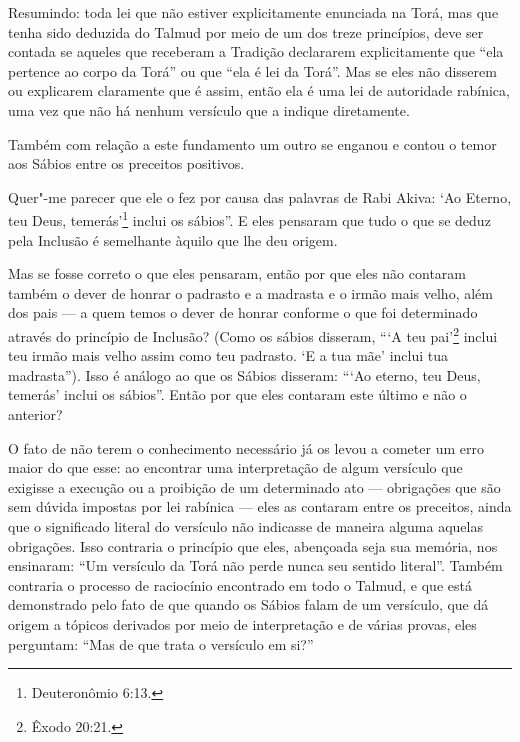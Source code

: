 Resumindo: toda lei que não estiver explicitamente enunciada na Torá\starr,
mas que tenha sido deduzida do Talmud\starr{} por meio de um dos treze
princípios, deve ser contada se aqueles que receberam a Tradição
declararem explicitamente que ``ela pertence ao corpo da Torá\starr'' ou que
``ela é lei da Torá\starr''. Mas se eles não disserem ou explicarem
claramente que é assim, então ela é uma lei de autoridade rabínica, uma
vez que não há nenhum versículo que a indique diretamente.

Também com relação a este fundamento um outro se enganou e contou o
temor aos Sábios entre os preceitos positivos.

Quer"-me parecer que ele o fez por causa das palavras de Rabi Akiva\starr: `Ao
Eterno, teu Deus, temerás'\footnote{Deuteronômio 6:13.} inclui os sábios''. E
eles pensaram que tudo o que se deduz pela Inclusão é semelhante àquilo
que lhe deu origem.

Mas se fosse correto o que eles pensaram, então por que eles não
contaram também o dever de honrar o padrasto e a madrasta e o irmão mais
velho, além dos pais --- a quem temos o dever de honrar conforme o que
foi determinado através do princípio de Inclusão? (Como os sábios
disseram, ```A teu pai'\footnote{Êxodo 20:21.} inclui teu irmão mais velho assim
como teu padrasto. `E a tua mãe' inclui tua madrasta''). Isso é análogo
ao que os Sábios disseram: ```Ao eterno, teu Deus, temerás' inclui os
sábios''. Então por que eles contaram este último e não o anterior?

O fato de não terem o conhecimento necessário já os levou a cometer um
erro maior do que esse: ao encontrar uma interpretação de algum
versículo que exigisse a execução ou a proibição de um determinado ato
--- obrigações que são sem dúvida impostas por lei rabínica --- eles as
contaram entre os preceitos, ainda que o significado literal do
versículo não indicasse de maneira alguma aquelas obrigações. Isso
contraria o princípio que eles, abençoada seja sua memória, nos
ensinaram: ``Um versículo da Torá\starr{} não perde nunca seu sentido
literal''. Também contraria o processo de raciocínio encontrado em todo
o Talmud\starr, e que está demonstrado pelo fato de que quando os Sábios falam
de um versículo, que dá origem a tópicos derivados por meio de
interpretação e de várias provas, eles perguntam: ``Mas de que trata o
versículo em si?''

